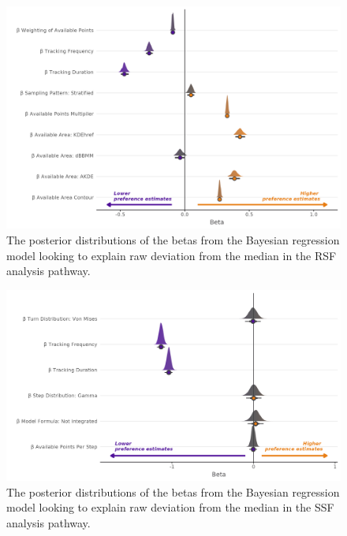 \documentclass[10pt,a4paper]{article}
\begin{document}
\begin{figure}
\includegraphics[width=1\linewidth]{../figures/rsf_rEstRSF_effectsPlot} \caption{The posterior distributions of the betas from the Bayesian regression model looking to explain raw deviation from the median in the RSF analysis pathway.}\label{fig:rEstBetasRSF}
\end{figure}

\begin{figure}
\includegraphics[width=1\linewidth]{../figures/ssf_rEstSSF_effectsPlot} \caption{The posterior distributions of the betas from the Bayesian regression model looking to explain raw deviation from the median in the SSF analysis pathway.}\label{fig:rEstBetasSSF}
\end{figure}
\end{document}

